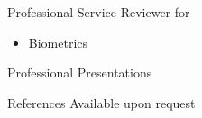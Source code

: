 \documentclass{resume} %
\begin{document}

\begin{rSection}{Professional Service}
Reviewer for
\begin{itemize}
\item Biometrics
\end{itemize}
\end{rSection}

\begin{rSection}{Professional Presentations}

\begin{refsection}
\nocite{*}
\leavevmode\printbibliography[omitnumbers=true,heading=none]
\end{refsection}

\end{rSection}

\begin{rSection}{References}
Available upon request
\end{rSection}
\end{document}
